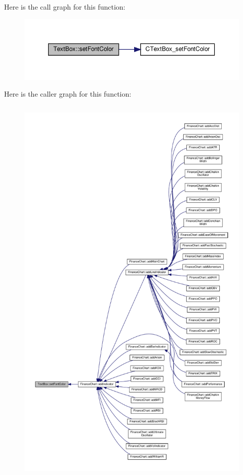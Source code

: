 Here is the call graph for this function\+:
\nopagebreak
\begin{figure}[H]
\begin{center}
\leavevmode
\includegraphics[width=350pt]{class_text_box_a991aea7906f9a570f47804b35206fe3a_cgraph}
\end{center}
\end{figure}
Here is the caller graph for this function\+:
\nopagebreak
\begin{figure}[H]
\begin{center}
\leavevmode
\includegraphics[height=550pt]{class_text_box_a991aea7906f9a570f47804b35206fe3a_icgraph}
\end{center}
\end{figure}
\mbox{\label{class_text_box_ac0f1e542059007afdbc987f9799afa59}} 
